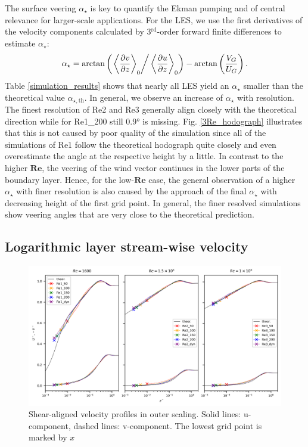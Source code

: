 \documentclass[draft,a4paper,11pt]{article}
\newcommand{\RE}{\mathbf{Re}}
\begin{document}
The surface veering $\alpha_\star$ is key to quantify the Ekman pumping and of central relevance for larger-scale applications. For the LES, we use the first derivatives of the velocity components calculated by 3$^\text{rd}$-order forward finite differences to estimate $\alpha_\star$:
\begin{align}
  \alpha_\star = \arctan\left(\left.\left\langle \frac{\partial v}{\partial z}\right\rangle_0\right/\left\langle \frac{\partial u}{\partial z}\right\rangle_0\right)-\arctan\left(\frac{V_G}{U_G}\right).
\end{align}
 Table \ref{simulation_results} shows that nearly all LES yield an $\alpha_\star$ smaller than the theoretical value $\alpha_{\star,\text{th}}$. In general, we observe an increase of $\alpha_\star$ with resolution. The finest resolution of Re2 and Re3 generally align closely with the theoretical direction while for Re1\_200 still 0.9° is missing. Fig. \ref{3Re_hodograph} illustrates that this is not caused by poor quality of the simulation since all of the simulations of Re1 follow the theoretical hodograph quite closely and even overestimate the angle at the respective height by a little. In contrast to the higher $\RE$, the veering of the wind vector continues in the lower parts of the boundary layer. Hence, for the low-$\RE$ case, the general observation of a higher $\alpha_\star$ with finer resolution is also caused by the approach of the final $\alpha_\star$ with decreasing height of the first grid point. In general, the finer resolved simulations show veering angles that are very close to the theoretical prediction.

\subsection{Logarithmic layer stream-wise velocity}
\label{vel_profiles}

\begin{figure}[ht]
  \centerline{
	\includegraphics[width=\textwidth]{figures_2024/d3y_3Re_profiles_outer.png}
	}
  \caption{Shear-aligned velocity profiles in outer scaling. Solid lines: u-component, dashed lines: v-component. The lowest grid point is marked by $x$}
  \label{velocity_outer}
\end{figure}
\end{document}
